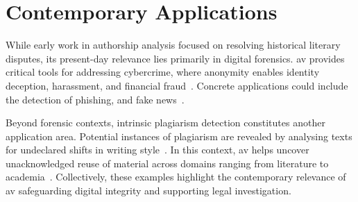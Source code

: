 \section{Contemporary Applications} %
\label{sec:digital_forensics}

While early work in authorship analysis focused on resolving historical literary disputes, its present-day relevance lies primarily in digital forensics. %
\ac{av} provides critical tools for addressing cybercrime, where anonymity enables identity deception, harassment, and financial fraud~\citep{abbasi_writeprints_2008,uchendu_authorship_2020,bhattacharjee_fighting_2024}. 
Concrete applications could include the detection of phishing, and fake news~\citep{mao_raidar_2024,li_learning_2025,baradia_mirror_2025}.%

Beyond forensic contexts, intrinsic plagiarism detection constitutes another application area.
Potential instances of plagiarism are revealed by analysing texts for undeclared shifts in writing style~\citep{stein_intrinsic_2011}. 
In this context, \ac{av} helps uncover unacknowledged reuse of material across domains ranging from literature to academia~\citep{neal_surveying_2018}. 
Collectively, these examples highlight the contemporary relevance of \ac{av} safeguarding digital integrity and supporting legal investigation.
